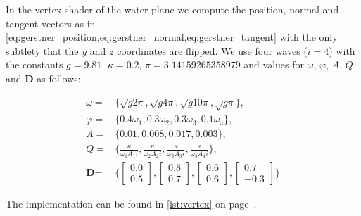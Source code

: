 In the vertex shader of the water plane we compute the position, normal and
tangent vectors as in
\cref{eq:gerstner_position,eq:gerstner_normal,eq:gerstner_tangent} with the only
subtlety that the $y$ and $z$ coordinates are flipped. We use four waves ($i =
4$) with the constants $g = 9.81$, $\kappa = 0.2$, $\pi = 3.14159265358979$ and 
values for $\omega$, $\varphi$, $A$, $Q$ and $\textbf{D}$ as follows:

\begin{equation}\label{eq:gerstner_constants}
\begin{split}
    \omega ={}& \Big\{\sqrt{g 2\pi}, \sqrt{g 4\pi}, \sqrt{g 10\pi}, \sqrt{g
    \pi}\Big\},\\
    \varphi ={}& \{0.4 \omega_1, 0.3 \omega_2, 0.3 \omega_3, 0.1 \omega_4\},\\
    A ={}& \{0.01, 0.008, 0.017, 0.003\},\\
    Q ={}& \Bigg\{\frac{\kappa}{\omega_1 A_1 i}, \frac{\kappa}{\omega_2 A_2 i},
    \frac{\kappa}{\omega_3 A_3 i}, \frac{\kappa}{\omega_4 A_4 i} \Bigg\},\\
    \textbf{D} ={}& \Bigg\{\begin{bmatrix}0.0 \\ 0.5\end{bmatrix},
    \begin{bmatrix}0.8 \\ 0.7\end{bmatrix}, \begin{bmatrix}0.6 \\
    0.6\end{bmatrix}, \begin{bmatrix}0.7 \\ -0.3\end{bmatrix}\Bigg\}
\end{split}
\end{equation}

The implementation can be found in \autoref{lst:vertex} on
page~\pageref{lst:vertex}.


